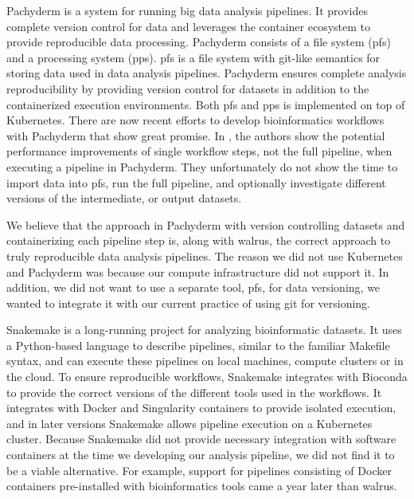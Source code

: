 Pachyderm is a system for running  big data analysis pipelines. It provides
complete version control for data and leverages the container ecosystem to
provide reproducible data processing.\cite{pachyderm} Pachyderm consists of a
file system (\gls{pfs}) and a processing system (\gls{pps}).  \gls{pfs} is a
file system with git-like semantics for storing data used in data analysis
pipelines. Pachyderm ensures complete analysis reproducibility by providing
version control for datasets in addition to the containerized execution
environments. Both \gls{pfs} and \gls{pps} is implemented on top of
Kubernetes.\cite{kubernetes} There are now recent efforts to develop
bioinformatics workflows with Pachyderm that show great
promise. In \cite{doi:10.1093/bioinformatics/bty699}, the authors show the
potential performance improvements of single workflow steps, not the full
pipeline, when executing a pipeline in Pachyderm. They unfortunately do not show
the time to import data into \gls{pfs}, run the full pipeline, and optionally
investigate different versions of the intermediate, or output datasets. 

We believe that the approach in Pachyderm with
version controlling datasets and containerizing each pipeline step is, along
with walrus, the correct approach to truly reproducible data analysis pipelines.
The reason we did not use Kubernetes and Pachyderm was because our compute
infrastructure did not support it. In addition, we did not want to use a
separate tool, \gls{pfs}, for data versioning, we wanted to integrate it with
our current practice of using git for versioning.  

Snakemake is a long-running project for analyzing bioinformatic
datasets.\cite{koster2012snakemake} It uses a Python-based language to describe
pipelines, similar to the familiar Makefile syntax, and can execute these
pipelines on local machines, compute clusters or in the cloud. To ensure
reproducible workflows, Snakemake integrates with Bioconda to provide the
correct versions of the different tools used in the workflows. It integrates
with Docker and Singularity containers\cite{singularity} to provide isolated
execution, and in later versions Snakemake allows pipeline execution on a
Kubernetes cluster. Because Snakemake did not provide necessary integration with
software containers at the time we developing our analysis pipeline, we did not
find it to be a viable alternative. For example, support for pipelines
consisting of Docker containers pre-installed with bioinformatics tools came a
year later than walrus. 

